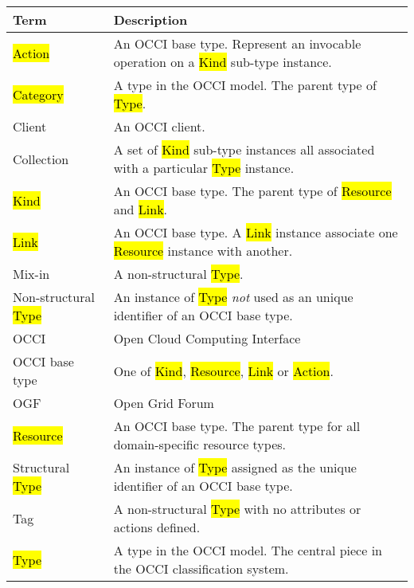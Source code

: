 \begin{tabular}{l|p{11cm}}
Term & Description \\
\hline
\hl{Action} & An OCCI base type. Represent an invocable operation on a \hl{Kind} sub-type instance. \\
\hl{Category} & A type in the OCCI model. The parent type of \hl{Type}. \\
Client & An OCCI client.\\
Collection & A set of \hl{Kind} sub-type instances all associated with a particular \hl{Type} instance. \\
\hl{Kind} & An OCCI base type. The parent type of \hl{Resource} and \hl{Link}. \\
\hl{Link} & An OCCI base type. A \hl{Link} instance associate one \hl{Resource} instance with another. \\
Mix-in & A non-structural \hl{Type}. \\
Non-structural \hl{Type} & An instance of \hl{Type} {\em not} used as an unique identifier of an OCCI base type. \\
OCCI & Open Cloud Computing Interface \\
OCCI base type & One of \hl{Kind}, \hl{Resource}, \hl{Link} or \hl{Action}. \\
OGF & Open Grid Forum \\
\hl{Resource} & An OCCI base type. The parent type for all domain-specific resource types. \\
Structural \hl{Type} & An instance of \hl{Type} assigned as the unique identifier of an OCCI base type. \\
Tag & A non-structural \hl{Type} with no attributes or actions defined. \\
\hl{Type} & A type in the OCCI model. The central piece in the OCCI classification system. \\
\end{tabular}
